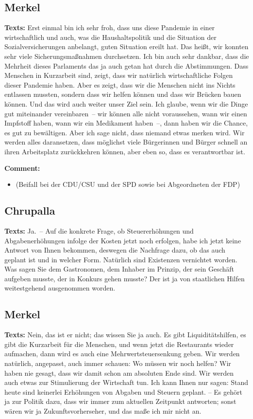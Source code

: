 \documentclass{article}
\begin{document}
\subsection{Merkel}
\noindent\textbf{Texts:} Erst einmal bin ich sehr froh, dass uns diese Pandemie in einer wirtschaftlich und auch, was die Haushaltspolitik und die Situation der Sozialversicherungen anbelangt, guten Situation ereilt hat. Das heißt, wir konnten sehr viele Sicherungsmaßnahmen durchsetzen. Ich bin auch sehr dankbar, dass die Mehrheit dieses Parlaments das ja auch getan hat durch die Abstimmungen. Dass Menschen in Kurzarbeit sind, zeigt, dass wir natürlich wirtschaftliche Folgen dieser Pandemie haben. Aber es zeigt, dass wir die Menschen nicht ins Nichts entlassen mussten,  sondern dass wir helfen können und dass wir Brücken bauen können. Und das wird auch weiter unser Ziel sein. Ich glaube, wenn wir die Dinge gut miteinander vereinbaren – wir können alle nicht voraussehen, wann wir einen Impfstoff haben, wann wir ein Medikament haben –, dann haben wir die Chance, es gut zu bewältigen. Aber ich sage nicht, dass niemand etwas merken wird. Wir werden alles daransetzen, dass möglichst viele Bürgerinnen und Bürger schnell an ihren Arbeitsplatz zurückkehren können, aber eben so, dass es verantwortbar ist.

\noindent\textbf{Comment:}
\begin{itemize}
    \setlength\itemsep{-3pt}
    \item (Beifall bei der CDU/CSU und der SPD sowie bei Abgeordneten der FDP)
\end{itemize}
\subsection{Chrupalla}
\noindent\textbf{Texts:} Ja. – Auf die konkrete Frage, ob Steuererhöhungen und Abgabenerhöhungen infolge der Kosten jetzt noch erfolgen, habe ich jetzt keine Antwort von Ihnen bekommen, deswegen die Nachfrage dazu, ob das auch geplant ist und in welcher Form. Natürlich sind Existenzen vernichtet worden. Was sagen Sie dem Gastronomen, dem Inhaber im Prinzip, der sein Geschäft aufgeben musste, der in Konkurs gehen musste? Der ist ja von staatlichen Hilfen weitestgehend ausgenommen worden.

\subsection{Merkel}
\noindent\textbf{Texts:} Nein, das ist er nicht; das wissen Sie ja auch. Es gibt Liquiditätshilfen, es gibt die Kurzarbeit für die Menschen,  und wenn jetzt die Restaurants wieder aufmachen, dann wird es auch eine Mehrwertsteuersenkung geben. Wir werden natürlich, angepasst, auch immer schauen: Wo müssen wir noch helfen? Wir haben nie gesagt, dass wir damit schon am absoluten Ende sind. Wir werden auch etwas zur Stimulierung der Wirtschaft tun. Ich kann Ihnen nur sagen: Stand heute sind keinerlei Erhöhungen von Abgaben und Steuern geplant.  – Es gehört ja zur Politik dazu, dass wir immer zum aktuellen Zeitpunkt antworten; sonst wären wir ja Zukunftsvorherseher, und das maße ich mir nicht an.
\end{document}

